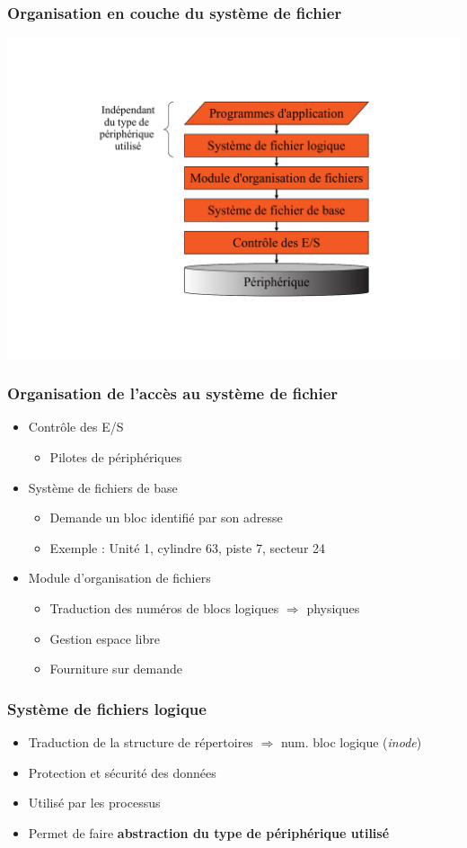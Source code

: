 \begin{frame}
\frametitle{Organisation en couche du système de fichier}
\includegraphics[height=.9\textheight]{../illustration/couches_systeme_fichier.pdf}
\end{frame}

\begin{frame}
\frametitle{Organisation de l'accès au système de fichier}
\begin{itemize}
\item Contrôle des E/S
\begin{itemize}
\item Pilotes de périphériques
\end{itemize}
\item Système de fichiers de base
\begin{itemize}
\item Demande un bloc identifié par son adresse
\item Exemple : Unité 1, cylindre 63, piste 7, secteur 24
\end{itemize}
\item Module d'organisation de fichiers
\begin{itemize}
\item Traduction des numéros de blocs logiques $\Longrightarrow$ physiques
\item Gestion espace libre
\item Fourniture sur demande 
\end{itemize}
\end{itemize}
\end{frame}

\begin{frame}
\frametitle{Système de fichiers logique}
\begin{itemize}
\item Traduction de la structure de répertoires $\Longrightarrow$ num. bloc logique (\textit{inode})
\item Protection et sécurité des données
\item Utilisé par les processus

\item Permet de faire \textbf{abstraction du type de périphérique utilisé }
\end{itemize}
\end{frame}

